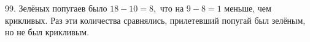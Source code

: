 99. Зелёных попугаев было $18-10=8,$ что на $9-8=1$ меньше, чем крикливых. Раз эти количества сравнялись, прилетевший попугай был зелёным, но не был крикливым.\\
